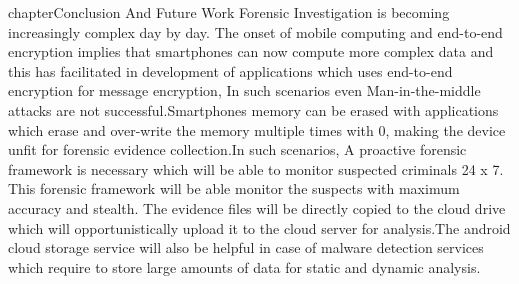 chapter{Conclusion And Future Work}
\label{chap:Conclusion And Future Work}
Forensic Investigation is becoming increasingly complex day by day. The onset of mobile computing and end-to-end encryption implies that smartphones can now compute more complex data and this has facilitated in development of applications which uses end-to-end encryption for message encryption, In such scenarios even Man-in-the-middle attacks are not successful.Smartphones memory  can be erased with 
applications which erase and over-write the memory multiple times with 0, making the device unfit for forensic evidence collection.In such scenarios, A proactive forensic framework is necessary which will be able to monitor suspected criminals 24 x 7. This forensic framework will be able monitor the suspects with maximum accuracy and stealth. The evidence files will be directly copied to the cloud drive which will opportunistically upload it to the cloud server for analysis.The android cloud storage service will also be helpful in case of malware detection services which require to store large amounts of data for static and dynamic analysis.